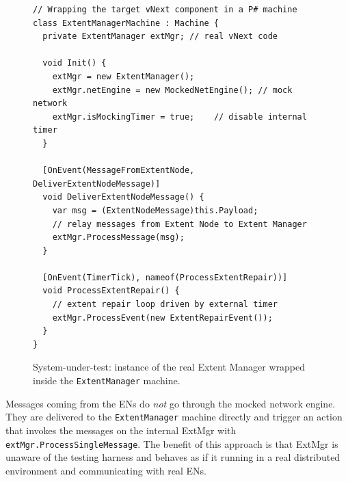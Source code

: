 
\begin{figure}[t]
\begin{lstlisting}
// Wrapping the target vNext component in a P# machine
class ExtentManagerMachine : Machine {
  private ExtentManager extMgr; // real vNext code

  void Init() {
    extMgr = new ExtentManager();
    extMgr.netEngine = new MockedNetEngine(); // mock network
    extMgr.isMockingTimer = true;	 // disable internal timer
  }

  [OnEvent(MessageFromExtentNode, DeliverExtentNodeMessage)]
  void DeliverExtentNodeMessage() {
    var msg = (ExtentNodeMessage)this.Payload;
    // relay messages from Extent Node to Extent Manager
    extMgr.ProcessMessage(msg);
  }
	
  [OnEvent(TimerTick), nameof(ProcessExtentRepair))]
  void ProcessExtentRepair() {
    // extent repair loop driven by external timer
    extMgr.ProcessEvent(new ExtentRepairEvent());
  }
}
\end{lstlisting}
\vspace{-2mm}
\caption{System-under-test: instance of the real Extent Manager wrapped inside the \texttt{ExtentManager} machine.}
\label{fig:wrap_target}
\end{figure}

Messages coming from the ENs do {\em not} go through the mocked network engine. They are delivered to the \texttt{ExtentManager} machine directly and trigger an action that invokes the messages on the internal ExtMgr with \texttt{extMgr.ProcessSingleMessage}. The benefit of this approach is that ExtMgr is unaware of the testing harness and behaves as if it running in a real distributed environment and communicating with real ENs.

